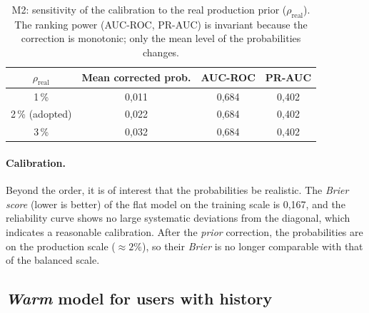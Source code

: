 \begin{table}[htbp]
\centering
\caption{M2: sensitivity of the calibration to the real production prior ($\rho_\text{real}$). The ranking power (AUC-ROC, PR-AUC) is invariant because the correction is monotonic; only the mean level of the probabilities changes.}
\label{tab:m2_prior}
\begin{tabular}{cccc}
\toprule
\textbf{$\rho_\text{real}$} & \textbf{Mean corrected prob.} & \textbf{AUC-ROC} & \textbf{PR-AUC} \\
\midrule
1\,\%          & 0,011 & 0,684 & 0,402 \\
2\,\% (adopted) & 0,022 & 0,684 & 0,402 \\
3\,\%          & 0,032 & 0,684 & 0,402 \\
\bottomrule
\end{tabular}
\end{table}

\paragraph{Calibration.} Beyond the order, it is of interest that the probabilities be realistic. The \textit{Brier score} (lower is better) of the flat model on the training scale is 0,167, and the reliability curve shows no large systematic deviations from the diagonal, which indicates a reasonable calibration. After the \textit{prior} correction, the probabilities are on the production scale ($\approx2\%$), so their \textit{Brier} is no longer comparable with that of the balanced scale.

\subsection{\textit{Warm} model for users with history}


